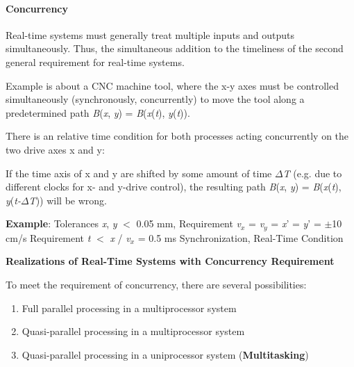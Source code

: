 \paragraph{  Concurrency}

Real-time systems must generally treat multiple inputs and outputs simultaneously. Thus, the simultaneous addition to the timeliness of the second general requirement for real-time systems.

Example is about a CNC machine tool, where the x-y axes must be controlled simultaneously (synchronously, concurrently) to move the tool along a predetermined path \textit{B}(\textit{x}, \textit{y}) = \textit{B}(\textit{x}(\textit{t}), \textit{y}(\textit{t})). 

There is an relative time condition for both processes acting concurrently on the two drive axes x and y:

If the time axis of x and y are shifted by some amount of time $\Delta$\textit{T} (e.g. due to different clocks for x- and y-drive control), the resulting path \textit{B}(\textit{x}, \textit{y}) = \textit{B}(\textit{x}(\textit{t}), \textit{y}(\textit{t-}$\Delta$\textit{T})) will be wrong.

\textbf{Example}: Tolerances {\textbar}\textit{x}{\textbar}, {\textbar}\textit{y}{\textbar} $\mathrm{<}$ 0.05 mm,   Requirement    \textit{v${}_{x}$} = \textit{v${}_{y}$} = \textit{x}' = \textit{y}' = $\mathrm{\pm}$10 cm/s     Requirement     {\textbar}\textit{t}{\textbar} $\mathrm{<}$ {\textbar}\textit{x}{\textbar} / {\textbar}\textit{v${}_{x}$}{\textbar} = 0.5 ms       Synchronization, Real-Time Condition

\textbf{ Realizations of Real-Time Systems with Concurrency Requirement}

To meet the requirement of concurrency, there are several possibilities:

\begin{enumerate}
	\item  Full parallel processing in a multiprocessor system
	\item  Quasi-parallel processing in a multiprocessor system
	\item  Quasi-parallel processing in a uniprocessor system (\textbf{Multitasking})
\end{enumerate}

